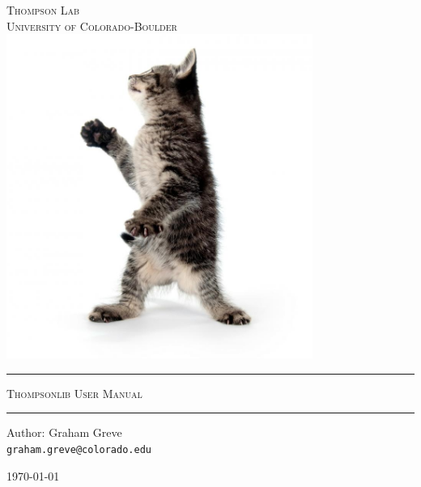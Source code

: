 \documentclass[10pt]{report}
\begin{document}
\begin{titlepage}
	\begin{center}
	\vspace{45mm} %
	\hspace{17mm}
  	
  	\vspace{10mm}
	\textsc{\LARGE Thompson Lab \\\vspace{5mm} University of Colorado-Boulder}\\[18mm]
	
	\hspace{17mm}
	\includegraphics[width=100mm]{images/cover.jpg}\newline\\\vspace{10mm}
	\hrule \vspace{4mm}
	{ \huge \textsc{Thompsonlib User Manual}}\\[0.4cm]
	\hrule

	\vspace{10mm} \large
	Author: Graham Greve \\ \texttt{graham.greve@colorado.edu}
	\vfill

	{\large \today}
	\end{center}
\end{titlepage}
\cleardoublepage
\tableofcontents
\cleardoublepage
\end{document}
